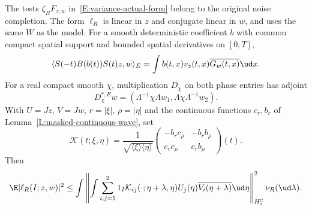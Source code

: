 \begin{proposition}\label{P:actual-wave-form}
  The tests $\zeta_RF_{z,w}$ in~\eqref{E:variance-actual-form} belong to the
  original noise completion. The form $\ell_R$ is linear in $z$ and
  conjugate linear in $w$, and uses the same $W$ as the model.
  For a smooth deterministic coefficient $b$ with
  common compact spatial support and bounded spatial derivatives on $[0,T]$,
  \begin{equation}\label{E:variance-physical-adjoint}
    \langle S(-t)B(b(t))S(t)z,w\rangle_E
    = \int b(t,x)v_z(t,x)\overline{G_w(t,x)}\ud x.
  \end{equation}
  For a real compact smooth $\chi$, multiplication $D_\chi$ on both phase
  entries has adjoint
  \begin{equation}\label{E:variance-cutoff-adjoint}
    D_\chi^{*,E}w
    = \left(\Lambda^{-1}\chi\Lambda w_1,
    \Lambda\chi\Lambda^{-1}w_2\right).
  \end{equation}
  With $U = Jz$, $V = Jw$, $r = |\xi|$, $\rho = |\eta|$ and the
  continuous functions $c_r,b_r$ of Lemma~\ref{L:masked-continuous-wave}, set
  \begin{equation}\label{E:variance-normalized-kernel}
    \mathcal K(t;\xi,\eta)
    = \frac1{\sqrt{\langle\xi\rangle\langle\eta\rangle}}
    \begin{pmatrix}
      -b_rc_\rho & -b_rb_\rho\\
      c_rc_\rho & c_rb_\rho
    \end{pmatrix}(t).
  \end{equation}
  Then
  \begin{equation}\label{E:variance-normalized-covariance}
    \E|\ell_R(I;z,w)|^2
    \le \int\left\|\int\sum_{i,j=1}^2
    1_I\mathcal K_{ij}(\cdot;\eta+\lambda,\eta)
    U_j(\eta)\overline{V_i(\eta+\lambda)}\ud\eta
    \right\|_{H_a^{\mathbb C}}^2\nu_R(\ud\lambda).
  \end{equation}
\end{proposition}

